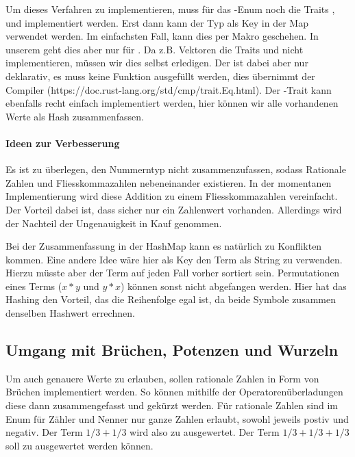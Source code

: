 \documentclass[11pt,a4paper, ngerman]{article}
\begin{document}
Um dieses Verfahren zu implementieren, muss für das -Enum noch die Traits ,  und  implementiert werden. Erst dann kann der Typ  als Key in der Map verwendet werden. Im einfachsten Fall, kann dies per Makro geschehen. In unserem geht dies aber nur für . Da z.B. Vektoren die Traits  und  nicht implementieren, müssen wir dies selbst erledigen. Der  ist dabei aber nur deklarativ, es muss keine Funktion ausgefüllt werden, dies übernimmt der Compiler (https://doc.rust-lang.org/std/cmp/trait.Eq.html). Der -Trait kann ebenfalls recht einfach implementiert werden, hier können wir alle vorhandenen Werte als Hash zusammenfassen.

\paragraph{Ideen zur Verbesserung} Es ist zu überlegen, den Nummerntyp nicht zusammenzufassen, sodass Rationale Zahlen und Fliesskommazahlen nebeneinander existieren. In der momentanen Implementierung wird diese Addition zu einem Fliesskommazahlen vereinfacht. Der Vorteil dabei ist, dass sicher nur ein Zahlenwert vorhanden. Allerdings wird der Nachteil der Ungenauigkeit in Kauf genommen.

Bei der Zusammenfassung in der HashMap kann es natürlich zu Konflikten kommen. Eine andere Idee wäre hier als Key den Term als String zu verwenden. Hierzu müsste aber der Term auf jeden Fall vorher sortiert sein. Permutationen eines Terms ($x*y$ und $y*x$) können sonst nicht abgefangen werden. Hier hat das Hashing den Vorteil, das die Reihenfolge egal ist, da beide Symbole zusammen denselben Hashwert errechnen.

\subsection{Umgang mit Brüchen, Potenzen und Wurzeln}
Um auch genauere Werte zu erlauben, sollen rationale Zahlen in Form von Brüchen implementiert werden. So können mithilfe der Operatorenüberladungen diese dann zusammengefasst und gekürzt werden. Für rationale Zahlen sind im Enum  für Zähler und Nenner nur ganze Zahlen erlaubt, sowohl jeweils postiv und negativ. Der Term $1/3+1/3$ wird also zu  ausgewertet. Der Term $1/3+1/3+1/3$ soll zu  ausgewertet werden können.
\end{document}
